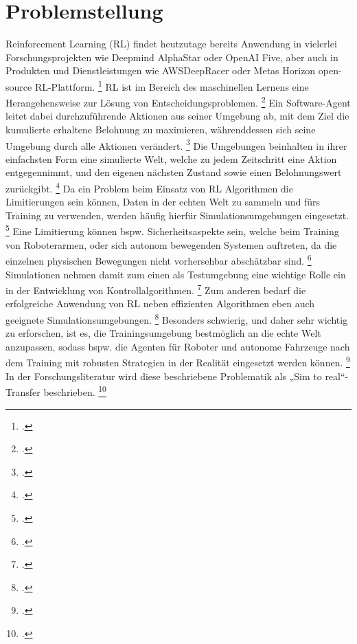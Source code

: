 \section{Problemstellung}

Reinforcement Learning (RL) findet heutzutage bereits Anwendung in vielerlei Forschungsprojekten wie Deepmind AlphaStar oder OpenAI Five, aber auch in Produkten und Dienstleistungen wie AWSDeepRacer oder Metas Horizon open-source RL-Plattform. \footcite[Vgl.][S. 4]{Li.2019}
RL ist im Bereich des maschinellen Lernens eine Herangehensweise zur Lösung von Entscheidungsproblemen. \footcite[Vgl.][S. 3]{Schuderer.2021}
Ein Software-Agent leitet dabei durchzuführende Aktionen aus seiner Umgebung ab, mit dem Ziel die kumulierte erhaltene Belohnung zu maximieren, währenddessen sich seine Umgebung durch alle Aktionen verändert. \footcite[Vgl.][S. 3]{Schuderer.2021}
Die Umgebungen beinhalten in ihrer einfachsten Form eine simulierte Welt, welche zu jedem Zeitschritt eine Aktion entgegennimmt, und den eigenen nächsten Zustand sowie einen Belohnungswert zurückgibt. \footcite[Vgl.][S. 1]{Reda.2020}
Da ein Problem beim Einsatz von RL Algorithmen die Limitierungen sein können, Daten in der echten Welt zu sammeln und fürs Training zu verwenden, werden häufig hierfür Simulationsumgebungen eingesetzt. \footcite[Vgl.][S. 737]{Zhao.2020}
Eine Limitierung können bspw. Sicherheitsaspekte sein, welche beim Training von Roboterarmen, oder sich autonom bewegenden Systemen auftreten, da die einzelnen physischen Bewegungen nicht vorhersehbar abschätzbar sind. \footcite[Vgl.][S. 738]{Zhao.2020}
Simulationen nehmen damit zum einen als Testumgebung eine wichtige Rolle ein in der Entwicklung von Kontrollalgorithmen. \footcite[Vgl.][S. 2]{Cutler.2014}
Zum anderen bedarf die erfolgreiche Anwendung von RL neben effizienten Algorithmen eben auch geeignete Simulationsumgebungen. \footcite[Vgl.][S. 8]{Reda.2020}
Besonders schwierig, und daher sehr wichtig zu erforschen, ist es, die Trainingsumgebung bestmöglich an die echte Welt anzupassen, sodass bspw. die Agenten für Roboter und autonome Fahrzeuge nach dem Training mit robusten Strategien in der Realität eingesetzt werden können. \footcite[Vgl.][S. 1]{DBLP:journals/corr/abs-1910-10537}
In der Forschungsliteratur wird diese beschriebene Problematik als „Sim to real“-Transfer beschrieben. \footcite[Vgl.][S. 738]{Zhao.2020}


